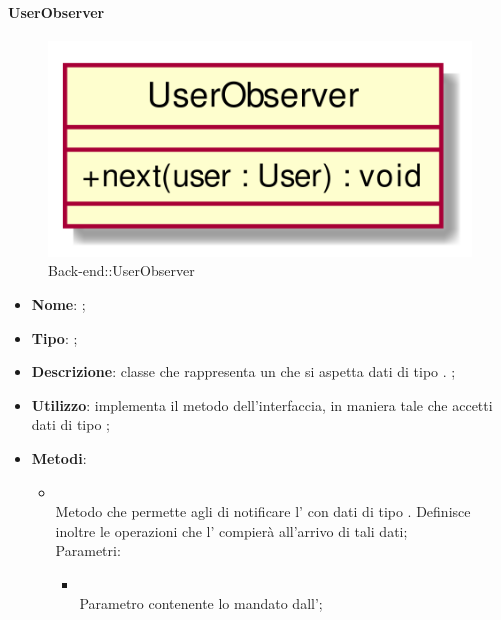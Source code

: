\hypertarget{UserObserver_label}{\paragraph{UserObserver}}
\begin{figure}[h]
	\centering
	\includegraphics[width=\textwidth,height=\textheight,keepaspectratio]{images/ClassUserObserver.png}
	\caption{Back-end::UserObserver}
\end{figure}
\begin{itemize}
	\item \textbf{Nome}: ;
	\item \textbf{Tipo}: ;
	\item \textbf{Descrizione}: classe che rappresenta un  che si aspetta dati di tipo . ;
	\item \textbf{Utilizzo}: implementa il metodo  dell'interfaccia, in maniera tale che accetti dati di tipo ;
	\item \textbf{Metodi}:
	\begin{itemize}
		\item[]  \\
		Metodo che permette agli  di notificare l' con dati di tipo . Definisce inoltre le operazioni che l' compierà all'arrivo di tali dati;\\
		Parametri:
		\begin{itemize}
			\item {} \\
			Parametro contenente lo  mandato dall';
		\end{itemize}
	\end{itemize}
\end{itemize}
\FloatBarrier

